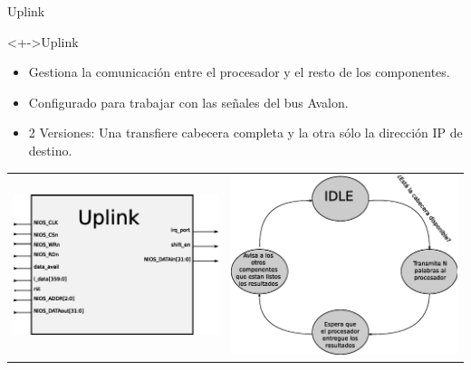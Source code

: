 \documentclass[xcolor=dvipsnames]{beamer}
\begin{document}
\begin{frame}{Uplink}
 \begin{block}<+->{Uplink}
	\begin{itemize}
      \scriptsize
	\item Gestiona la comunicación entre el procesador y el resto de los componentes.
	\item Configurado para trabajar con las señales del bus Avalon.
	\item 2 Versiones: Una transfiere cabecera completa y la otra sólo la dirección IP de destino.
	
	   \end{itemize}
 \begin{tabularx}{\linewidth}{Z|Z}
    \includegraphics[scale=0.35]{figures/bloquplink.eps} 
    &
    \includegraphics[scale=0.30]{figures/estuplink.eps}
    \\
  \end{tabularx}
\end{block}
\end{frame}
\end{document}
